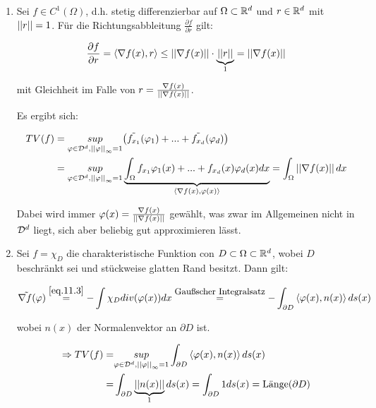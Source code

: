 \begin{enumerate}
    \item Sei $f \in C^1(\Omega)$, d.h. stetig differenzierbar auf $\Omega \subset \mathbb R^d$ und $r \in \mathbb R^d$ mit $\left|\left| r \right|\right|=1$. Für die Richtungsabbleitung $\frac{\partial f}{\partial r}$ gilt:

    \[\frac{\partial f}{\partial r} = \left \langle \nabla f(x),r \right \rangle \leq \left|\left| \nabla f(x) \right|\right| \cdot \underbrace{\left|\left| r \right|\right|}_{1} = \left|\left| \nabla f(x) \right|\right|\]

    mit Gleichheit im Falle von $r = \frac{\nabla f(x)}{\left|\left| \nabla f(x) \right|\right|}$.

    Es ergibt sich:

    \begin{align}\label{eq.11.5}
        TV(f) &= \underset{\varphi \in \mathcal{D}^d, \left|\left| \varphi \right|\right|_\infty = 1}{sup} \bigl(\tilde{f_{x_1}}(\varphi_1) + ... + \tilde{f_{x_d}}(\varphi_d)\bigr) \nonumber \\
        &= \underset{\varphi \in \mathcal{D}^d, \left|\left| \varphi \right|\right|_\infty = 1}{sup} \underbrace{\int_\Omega f_{x_1}\varphi_1(x) + ... + f_{x_d}(x)\varphi_d(x) dx}_{\left \langle \nabla f(x),\varphi(x) \right \rangle} = \int_\Omega \left|\left| \nabla f(x) \right|\right| dx
    \end{align}

    Dabei wird immer $\varphi(x) = \frac{\nabla f(x)}{\left|\left| \nabla f(x) \right|\right|}$ gewählt, was zwar im Allgemeinen nicht in $\mathcal{D}^d$ liegt, sich aber beliebig gut approximieren lässt.

    \item Sei $f= \chi_D$ die charakteristische Funktion con $D \subset \Omega \subset \mathbb R^d$, wobei $D$ beschränkt sei und stückweise glatten Rand besitzt.
    Dann gilt:

    \[\tilde{\nabla f}(\varphi) \overset{\eqref{eq.11.3}}{=} - \int \chi_D div(\varphi(x)) dx \overset{\text{\small{Gaußscher Integralsatz}}}{=} -\int_{\partial D} \left \langle \varphi(x),n(x) \right \rangle ds(x)\]

    wobei $n(x)$ der Normalenvektor an $\partial D$ ist.

    \begin{align}
        \Rightarrow TV(f) =& \underset{\varphi \in \mathcal{D}^d, \left|\left| \varphi \right|\right|_\infty = 1}{sup} \int_{\partial D} \left \langle \varphi(x),n(x) \right \rangle ds(x) \nonumber \\
        =& \int_{\partial D}\underbrace{\left|\left| n(x) \right|\right|}_{1} ds(x) = \int_{\partial D} 1 ds(x) = \text{Länge}(\partial D)
    \end{align}
\end{enumerate}

